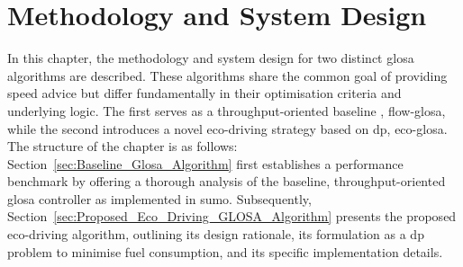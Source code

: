 \chapter{Methodology and System Design}
\label{ch:Methodology_System_Design}

In this chapter, the methodology and system design for two distinct \ac{glosa} algorithms are described. These algorithms share the common goal of providing speed advice but differ fundamentally in their optimisation criteria and underlying logic. The first serves as a throughput-oriented baseline , \ac{flow-glosa}, while the second introduces a novel eco-driving strategy based on \ac{dp}, \ac{eco-glosa}.
\mynewline
The structure of the chapter is as follows: Section~\vref{sec:Baseline_Glosa_Algorithm} first establishes a performance benchmark by offering a thorough analysis of the baseline, throughput-oriented \ac{glosa} controller as implemented in \ac{sumo}. Subsequently, Section~\vref{sec:Proposed_Eco_Driving_GLOSA_Algorithm} presents the proposed eco-driving algorithm, outlining its design rationale, its formulation as a \ac{dp} problem to minimise fuel consumption, and its specific implementation details.



